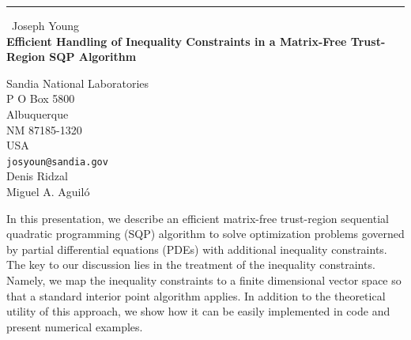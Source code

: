 \documentclass{report}
\begin{document}
\begin{center}
\rule{6in}{1pt} \
{\large Joseph Young \\
{\bf Efficient Handling of Inequality Constraints in a Matrix-Free Trust-Region SQP Algorithm}}

Sandia National Laboratories \\ P O Box 5800 \\ Albuquerque \\ NM 87185-1320 \\ USA
\\
{\tt josyoun@sandia.gov}\\
Denis Ridzal\\
Miguel A. Aguil\'o\end{center}

In this presentation, we describe an efficient matrix-free trust-region
sequential quadratic programming (SQP) algorithm to solve optimization
problems governed by partial differential equations (PDEs) with
additional inequality constraints. The key to our discussion lies in the
treatment of the inequality constraints. Namely, we map the inequality
constraints to a finite dimensional vector space so that a standard
interior point algorithm applies. In addition to the theoretical utility
of this approach, we show how it can be easily implemented in code and
present numerical examples.
\end{document}
